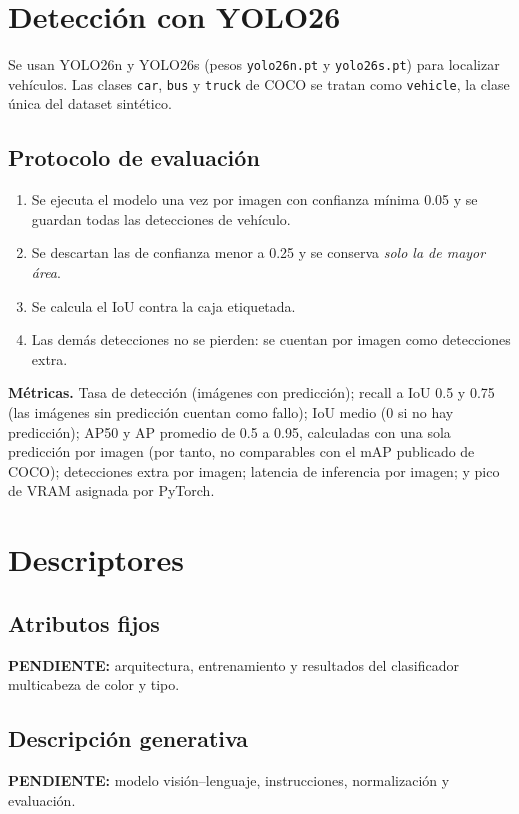\documentclass[11pt,a4paper]{article}
\newcommand{\pend}[1]{\textbf{PENDIENTE:} #1}
\begin{document}
\section{Detecci\'on con YOLO26}

Se usan YOLO26n y YOLO26s (pesos \texttt{yolo26n.pt} y \texttt{yolo26s.pt}) para localizar
veh\'iculos. Las clases \texttt{car}, \texttt{bus} y \texttt{truck} de COCO se tratan como
\texttt{vehicle}, la clase \'unica del dataset sint\'etico.

\subsection{Protocolo de evaluaci\'on}
\begin{enumerate}[noitemsep]
  \item Se ejecuta el modelo una vez por imagen con confianza m\'inima 0.05 y se guardan
        todas las detecciones de veh\'iculo.
  \item Se descartan las de confianza menor a 0.25 y se conserva \emph{solo la de mayor
        \'area}.
  \item Se calcula el IoU contra la caja etiquetada.
  \item Las dem\'as detecciones no se pierden: se cuentan por imagen como detecciones extra.
\end{enumerate}

\textbf{M\'etricas.} Tasa de detecci\'on (im\'agenes con predicci\'on); recall a IoU 0.5 y
0.75 (las im\'agenes sin predicci\'on cuentan como fallo); IoU medio (0 si no hay
predicci\'on); AP50 y AP promedio de 0.5 a 0.95, calculadas con una sola predicci\'on por
imagen (por tanto, no comparables con el mAP publicado de COCO); detecciones extra por
imagen; latencia de inferencia por imagen; y pico de VRAM asignada por PyTorch.

\section{Descriptores}

\subsection{Atributos fijos}
\pend{arquitectura, entrenamiento y resultados del clasificador multicabeza de color y tipo.}

\subsection{Descripci\'on generativa}
\pend{modelo visi\'on--lenguaje, instrucciones, normalizaci\'on y evaluaci\'on.}
\end{document}
